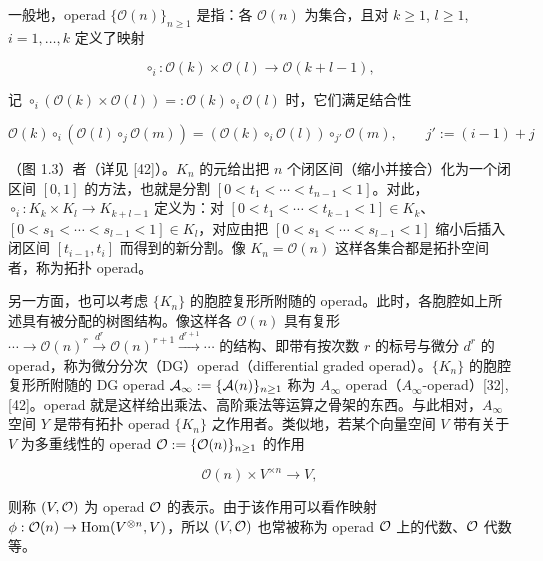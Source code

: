 一般地，operad $\{\mathcal{O}(n)\}_{n\ge1}$ 是指：各 $\mathcal{O}(n)$ 为集合，且对 $k\ge1$, $l\ge1$, $i=1,\ldots,k$ 定义了映射

\[\circ_i : \mathcal{O}(k)\times\mathcal{O}(l)\to\mathcal{O}(k+l-1),\]

记 $\circ_i(\mathcal{O}(k)\times\mathcal{O}(l))=:\mathcal{O}(k)\circ_i\mathcal{O}(l)$ 时，它们满足结合性

\[\mathcal{O}(k)\circ_i(\mathcal{O}(l)\circ_j\mathcal{O}(m))=(\mathcal{O}(k)\circ_i\mathcal{O}(l))\circ_{j'}\mathcal{O}(m),\qquad j' := (i-1)+j\]

（图 1.3）者（详见 [42]）。$K_n$ 的元给出把 $n$ 个闭区间（缩小并接合）化为一个闭区间 $[0,1]$ 的方法，也就是分割 $[0<t_1<\cdots<t_{n-1}<1]$。对此，$\circ_i : K_k\times K_l\to K_{k+l-1}$ 定义为：对 $[0<t_1<\cdots<t_{k-1}<1]\in K_k$、$[0<s_1<\cdots<s_{l-1}<1]\in K_l$，对应由把 $[0<s_1<\cdots<s_{l-1}<1]$ 缩小后插入闭区间 $[t_{i-1},t_i]$ 而得到的新分割。像 $K_n=\mathcal{O}(n)$ 这样各集合都是拓扑空间者，称为拓扑 operad。


另一方面，也可以考虑 $\{K_n\}$ 的胞腔复形所附随的 operad。此时，各胞腔如上所述具有被分配的树图结构。像这样各 $\mathcal{O}(n)$ 具有复形 $\cdots\to\mathcal{O}(n)^r\xrightarrow{d^r}\mathcal{O}(n)^{r+1}\xrightarrow{d^{r+1}}\cdots$ 的结构、即带有按次数 $r$ 的标号与微分 $d^r$ 的 operad，称为微分分次（DG）operad（differential graded operad）。$\{K_n\}$ 的胞腔复形所附随的 DG operad $\mathcal{A}_\infty := \{\mathcal{A}(n)\}_{n\ge1}$ 称为 $A_\infty$ operad（$A_\infty$-operad）[32], [42]。operad 就是这样给出乘法、高阶乘法等运算之骨架的东西。与此相对，$A_\infty$ 空间 $Y$ 是带有拓扑 operad $\{K_n\}$ 之作用者。类似地，若某个向量空间 $V$ 带有关于 $V$ 为多重线性的 operad $\mathcal{O} := \{\mathcal{O}(n)\}_{n\ge1}$ 的作用

\[\mathcal{O}(n)\times V^{\times n}\to V,\]

则称 $(V,\mathcal{O})$ 为 operad $\mathcal{O}$ 的表示。由于该作用可以看作映射 $\phi : \mathcal{O}(n)\to\operatorname{Hom}(V^{\otimes n},V)$，所以 $(V,\mathcal{O})$ 也常被称为 operad $\mathcal{O}$ 上的代数、$\mathcal{O}$ 代数等。


